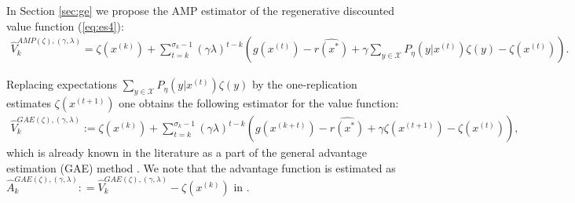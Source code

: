 \documentclass[11pt]{article}
\newcommand{\X}{\mathcal{X}}
\newtheorem{remark}{Remark}
\theoremstyle{definition}
\numberwithin{equation}{section}
\begin{document}




In Section \ref{sec:ge} we propose  the   AMP estimator of the  regenerative discounted value function (\ref{eq:es4}):
\begin{align}\label{eq:Ves2}
\hat V^{AMP( \zeta), (\gamma, \lambda)}_k =   \zeta(x^{(k)}) + \sum\limits_{t=k}^{\sigma_k-1} (\gamma\lambda)^{t-k} \left(g(x^{(t)})  - \widehat{ r(x^*)}+  \gamma \sum\limits_{y\in\X} P_{\eta}(y|x^{(t)})  \zeta(y)   -   \zeta(x^{(t)})  \right).
\end{align}


Replacing expectations $\sum\limits_{y\in \X} P_{\eta}\left(y|x^{(t)}\right)  \zeta(y)$ by the one-replication estimates $\zeta\left(x^{(t+1)}\right)$  one obtains the following estimator for the value function:
\begin{align}\label{eq:GAE}
\hat V^{GAE( \zeta), (\gamma, \lambda)}_k :=  \zeta(x^{(k) }) + \sum\limits_{t=k}^{\sigma_k-1} (\gamma\lambda)^{t-k} \left(g(x^{(k+t)})  - \widehat{ r(x^*)}+  \gamma \zeta(x^{(t+1)})   -   \zeta(x^{(t)})  \right),
\end{align}
which is already known in the literature as a part of  the general advantage estimation (GAE) method \cite{Schulman2016}. We note that the advantage function   is estimated as $
\hat A^{GAE( \zeta), (\gamma, \lambda)}_k : = \hat V^{GAE( \zeta), (\gamma, \lambda)}_k - \zeta\left(x^{(k)}\right)$ in  \cite{Schulman2016}.
\end{document}
